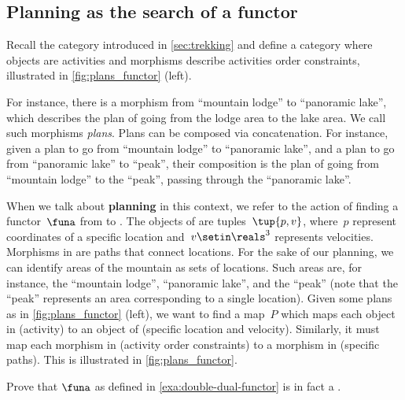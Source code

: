 \subsection{Planning as the search of a functor}

\begin{example}
    \label{ex:planning-as-search-functor}
    Recall the category \Berg introduced in \cref{sec:trekking} and define a category \Plans where objects are activities and morphisms describe activities order constraints, illustrated in \cref{fig:plans_functor} (left).

    For instance, there is a morphism from ``mountain lodge'' to ``panoramic lake'', which describes the plan of going from the lodge area to the lake area.
    We call such morphisms \emph{plans}.
    Plans can be composed via concatenation.
    For instance, given a plan to go from ``mountain lodge'' to ``panoramic lake'', and a plan to go from ``panoramic lake'' to ``peak'', their composition is the plan of going from ``mountain lodge'' to the ``peak'', passing through the ``panoramic lake''.

    When we talk about \textbf{planning} in this context, we refer to the action of finding a functor~$\funa$ from \Plans to \Berg.
    The objects of \Berg are tuples~$\tup{p,v}$, where~$p$ represent coordinates of a specific location and~$v\setin \reals^3$ represents velocities.
    Morphisms in \Berg are paths that connect locations.
    For the sake of our planning, we can identify areas of the mountain as sets of locations.
    Such areas are, for instance, the ``mountain lodge'', ``panoramic lake'', and the
    ``peak'' (note that the ``peak'' represents an area corresponding to a single location).
    Given some plans as in \cref{fig:plans_functor} (left), we want to find a map~$P$ which maps each object in \Plans (activity) to an object of \Berg (specific location and velocity).
    Similarly, it must map each morphism in \Plans (activity order constraints) to a morphism in \Berg (specific paths).
    This is illustrated in \cref{fig:plans_functor}.
\end{example}

\begin{figure*}[h!]
    \centering
    \caption{Planning .}
    \label{fig:plans_functor}
\end{figure*}

\vfill
\clearpage
\vfill

\begin{gradedexercise}
    \label{ex:DoubleDualFunctor}
    Prove that $\funa$ as defined in \cref{exa:double-dual-functor} is in fact a .
\end{gradedexercise}

